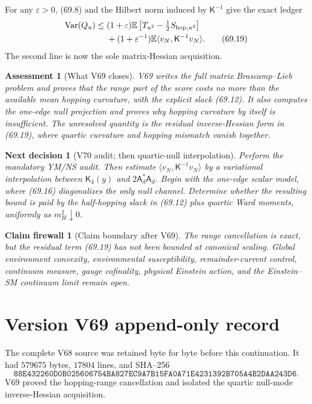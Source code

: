 \documentclass[11pt]{article}
\newtheorem{firewall}[theorem]{Claim firewall}
\newtheorem{decision}[theorem]{Next decision}
\newtheorem{assessment}[theorem]{Assessment}
\theoremstyle{remark}
\begin{document}
For any \(\varepsilon>0\), (69.8) and the Hilbert norm induced by
\(\mathsf K^{-1}\) give the exact ledger
\[
\begin{aligned}
 \operatorname{Var}(Q_u)
 \leq{}&(1+\varepsilon)
 \mathbb E\left[T_{u^2}-\tfrac12S_{{\rm hop},u^2}\right]\\
 &+(1+\varepsilon^{-1})
 \mathbb E\langle v_N,\mathsf K^{-1}v_N\rangle. \tag{69.19}
\end{aligned}
\]
The second line is now the sole matrix-Hessian acquisition.

\begin{assessment}[What V69 closes]
\label{ass:v17v69-status}
V69 writes the full matrix Brascamp--Lieb problem and proves that the
range part of the score costs no more than the available mean hopping
curvature, with the explicit slack (69.12).  It also computes the
one-edge null projection and proves why hopping curvature by itself is
insufficient.  The unresolved quantity is the residual inverse-Hessian
form in (69.19), where quartic curvature and hopping mismatch vanish
together.
\end{assessment}

\begin{decision}[V70 audit; then quartic-null interpolation]
\label{dec:v17v69-next}
Perform the mandatory YM/NS audit.  Then estimate
\(\langle v_N,\mathsf K^{-1}v_N\rangle\) by a variational interpolation
between \(\mathsf K_4(y)\) and
\(2\mathsf A_d^*\mathsf A_d\).  Begin with the one-edge scalar model,
where (69.16) diagonalizes the only null channel.  Determine whether
the resulting bound is paid by the half-hopping slack in (69.12) plus
quartic Ward moments, uniformly as \(m_H^2\downarrow0\).
\end{decision}

\begin{firewall}[Claim boundary after V69]
\label{fire:v17v69}
The range cancellation is exact, but the residual term (69.19) has
not been bounded at canonical scaling.  Global environment convexity,
environmental susceptibility, remainder-current control, continuum
measure, gauge cofinality, physical Einstein action, and the
Einstein--SM continuum limit remain open.
\end{firewall}

\section*{Version V69 append-only record}
The complete V68 source was retained byte for byte before this
continuation.  It had \(579675\) bytes, \(17804\) lines, and SHA--256
\[
 \texttt{88E432260D0B025606754BA827EC9A7B15FA0A71E4231392B705A4B2DAA243D6}.
\]
V69 proved the hopping-range cancellation and isolated the quartic
null-mode inverse-Hessian acquisition.
\end{document}
